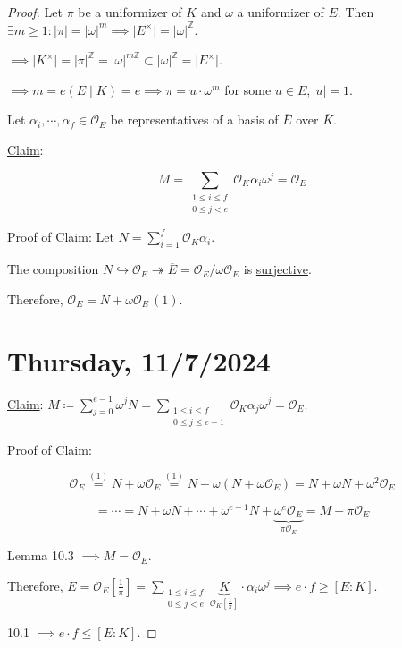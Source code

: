 \documentclass[openany]{amsbook}
\numberwithin{section}{chapter}
\theoremstyle{definition}
\begin{document}
\begin{proof}
    Let \(\pi\) be a uniformizer of \(K\) and \(\omega\) a uniformizer of \(E\). Then \(\exists m \geq 1: \vert \pi \vert = \vert \omega \vert ^m \implies \vert E^\times  \vert = \vert \omega \vert ^{\mathbb{Z}}\).

    \(\implies \vert K^\times \vert = \vert \pi \vert ^ \mathbb{Z} = \vert \omega \vert^{m\mathbb{Z}} \subset \vert \omega \vert ^ \mathbb{Z}  = \vert E^\times \vert \).

    \(\implies m = e(E \mid K) = e \implies \pi =u\cdot \omega^m\) for some \(u \in E, \vert u \vert = 1\).

    Let \(\alpha_i, \cdots , \alpha_f \in \mathcal{O}_E\) be representatives of a basis of \(\overline{E}\) over \(\overline{K}\).

    \underline{Claim}:

    \[
        M = \sum_{\substack{1 \leq i \leq f \\ 0 \leq j < e}} \mathcal{O}_K \alpha_i \omega^j = \mathcal{O}_E 
    \]

    \underline{Proof of Claim}: Let \(N =  \sum_{i=1}^f \mathcal{O}_K \alpha_i\).
    
    The composition \(N \hookrightarrow \mathcal{O}_E \twoheadrightarrow \overline{E} = \mathcal{O}_E / \omega \mathcal{O}_E\) is \underline{surjective}.

    Therefore, \(\mathcal{O}_E = N + \omega \mathcal{O}_E \, (1)\).

\section*{Thursday, 11/7/2024}

    \underline{Claim}: \(M \coloneqq \sum_{j=0}^{e-1} \omega^j N = \sum_{\substack{1 \leq i \leq f \\ 0 \leq j \leq e-1}} \mathcal{O}_K \alpha_j \omega^j = \mathcal{O}_E\).

    \underline{Proof of Claim}:

    \[
        \mathcal{O}_E \overset{(1)}{=} N + \omega \mathcal{O}_E \overset{(1)}{=} N + \omega (N + \omega \mathcal{O}_E) = N + \omega N + \omega^2 \mathcal{O}_E
    \]

    \[
        = \cdots = N + \omega N + \cdots + \omega ^{e-1} N + \underbrace{\omega^e \mathcal{O}_E}_{\pi \mathcal{O}_E} = M + \pi \mathcal{O}_E
    \]

    Lemma 10.3 \(\implies M = \mathcal{O}_E\).

    Therefore, \(E = \mathcal{O}_E \left[ \frac{1}{\pi} \right] = \sum_{\substack{1 \leq i \leq f \\ 0 \leq j < e}} \underbrace{K}_{\mathcal{O}_K \left[ \frac{1}{\pi} \right]}\cdot \alpha_i \omega^j \implies e \cdot f \geq [E:K]\).
    
    10.1 \(\implies e \cdot f \leq [E:K]\).

\end{proof}
\end{document}
